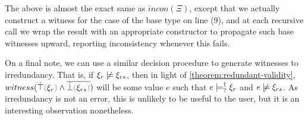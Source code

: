 The above is almost the exact same as $incon(\Xi)$, except that we actually construct a witness for the case of the base type on line (9), and at each recursive call we wrap the result with an appropriate constructor to propagate such base witnesses upward, reporting inconsistency whenever this fails.

On a final note, we can use a similar decision procedure to generate witnesses to irredundancy. That is, if $\cnotsatisfy{\xi_r}{\xi_{rs}}$, then in light of \autoref{theorem:redundant-validity}, $witness(\cand{\ctruify{\xi_r}}{\cdual{\cfalsify{\xi_{rs}}}})$ will be some value $e$ such that $e \models_{?}^{\dag} \xi_r$ and $\cnotsatisfy{e}{\xi_{rs}}$. As irredundancy is not an error, this is unlikely to be useful to the user, but it is an interesting observation nonetheless.